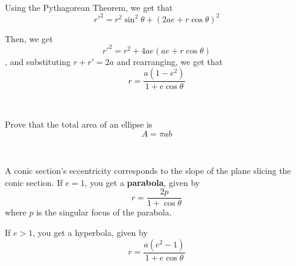 \documentclass{article}
\begin{document}
\begin{customproof}
\


Using the Pythagorean Theorem, we get that $$r'^2 = r^2 \sin^2\theta + (2ae + r \cos \theta)^2$$

Then, we get $$r'^2 = r^2 + 4ae(ae + r \cos\theta)$$, and substituting $r + r' = 2a$ and rearranging, we get that $$r = \frac{a(1-e^2)}{1+e\cos\theta}$$
\end{customproof}

\begin{exercise}
\

Prove that the total area of an ellipse is $$A = \pi ab$$
\end{exercise}

\begin{definition}
\

A conic section's eccentricity corresponds to the slope of the plane slicing the conic section. If $e = 1$, you get a \textbf{parabola}, given by $$r = \frac{2p}{1+\cos\theta}$$where $p$ is the singular focus of the parabola.

If $e > 1$, you get a hyperbola, given by $$r = \frac{a(e^2-1)}{1 + e\cos\theta}$$
\end{definition}
\end{document}
